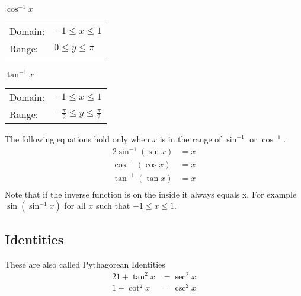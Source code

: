 \documentclass{article}
\numberwithin{equation}{section}
\begin{document}
\paragraph{$\cos ^{-1} x$}
\begin{tabular}{l l}
	Domain: & $-1 \le x \le 1$ \\
	Range: & $0 \le y \le \pi$ \\
\end{tabular}

\paragraph{$\tan ^{-1} x$}
\begin{tabular}{l l}
	Domain: & $-1 \le x \le 1$ \\
	Range: & $-\frac{\pi}{2} \le y \le \frac{\pi}{2}$ \\
\end{tabular}

\bigskip

The following equations hold only when $x$ is in the range of $\sin^{-1}$ or $\cos^{-1}$.
\begin{alignat*}{2}
	\sin ^ {-1} ( \sin x ) &= x  \\
	\cos ^ {-1} ( \cos x ) &= x  \\
	\tan ^ {-1} ( \tan x ) &= x  \\
\end{alignat*}
Note that if the inverse function is on the inside it always equals x. For example $\sin( \sin^{-1} x )$ for all $x$ such that $-1 \le x \le 1$.

\subsection{Identities}

These are also called Pythagorean Identities
\begin{alignat}{2}
	1 + \tan ^2 x &= \sec ^ 2x \\
	1 + \cot ^2 x &= \csc ^2 x
\end{alignat}
\end{document}
